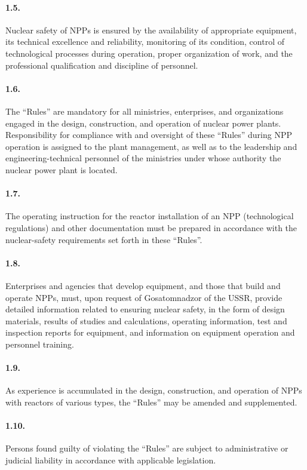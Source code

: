 \documentclass[openright]{bookest}
\begin{document}
\paragraph{1.5.} Nuclear safety of NPPs is ensured by the availability of appropriate equipment, its technical excellence and reliability, monitoring of its condition, control of technological processes during operation, proper organization of work, and the professional qualification and discipline of personnel.

\paragraph{1.6.} The ``Rules'' are mandatory for all ministries, enterprises, and organizations engaged in the design, construction, and operation of nuclear power plants. Responsibility for compliance with and oversight of these ``Rules'' during NPP operation is assigned to the plant management, as well as to the leadership and engineering-technical personnel of the ministries under whose authority the nuclear power plant is located.

\paragraph{1.7.} The operating instruction for the reactor installation of an NPP (technological regulations) and other documentation must be prepared in accordance with the nuclear-safety requirements set forth in these ``Rules''.

\paragraph{1.8.} Enterprises and agencies that develop equipment, and those that build and operate NPPs, must, upon request of Gosatomnadzor of the USSR, provide detailed information related to ensuring nuclear safety, in the form of design materials, results of studies and calculations, operating information, test and inspection reports for equipment, and information on equipment operation and personnel training.

\paragraph{1.9.} As experience is accumulated in the design, construction, and operation of NPPs with reactors of various types, the ``Rules'' may be amended and supplemented.

\paragraph{1.10.} Persons found guilty of violating the ``Rules'' are subject to administrative or judicial liability in accordance with applicable legislation.
\end{document}
